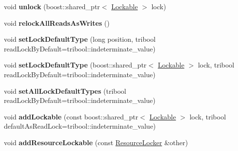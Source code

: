 \begin{DoxyCompactItemize}
\item 
\hypertarget{classcore_1_1threading_1_1_resource_locker_a9464386fc7233fbe830e49c4c0647afe}{void {\bfseries unlock} (boost\-::shared\-\_\-ptr$<$ \hyperlink{classcore_1_1threading_1_1_lockable}{Lockable} $>$ lock)}\label{classcore_1_1threading_1_1_resource_locker_a9464386fc7233fbe830e49c4c0647afe}

\item 
\hypertarget{classcore_1_1threading_1_1_resource_locker_ab740d66b331ea3f19bdf6187a281ae8c}{void {\bfseries relock\-All\-Reads\-As\-Writes} ()}\label{classcore_1_1threading_1_1_resource_locker_ab740d66b331ea3f19bdf6187a281ae8c}

\item 
\hypertarget{classcore_1_1threading_1_1_resource_locker_a36cd91f3f36167989267598df4e2ded8}{void {\bfseries set\-Lock\-Default\-Type} (long position, tribool read\-Lock\-By\-Default=tribool\-::indeterminate\-\_\-value)}\label{classcore_1_1threading_1_1_resource_locker_a36cd91f3f36167989267598df4e2ded8}

\item 
\hypertarget{classcore_1_1threading_1_1_resource_locker_acbbef3762d503d361d9693e6c74c302a}{void {\bfseries set\-Lock\-Default\-Type} (boost\-::shared\-\_\-ptr$<$ \hyperlink{classcore_1_1threading_1_1_lockable}{Lockable} $>$ lock, tribool read\-Lock\-By\-Default=tribool\-::indeterminate\-\_\-value)}\label{classcore_1_1threading_1_1_resource_locker_acbbef3762d503d361d9693e6c74c302a}

\item 
\hypertarget{classcore_1_1threading_1_1_resource_locker_ac2f676b46042839d02da3258d07daa0c}{void {\bfseries set\-All\-Lock\-Default\-Types} (tribool read\-Lock\-By\-Default=tribool\-::indeterminate\-\_\-value)}\label{classcore_1_1threading_1_1_resource_locker_ac2f676b46042839d02da3258d07daa0c}

\item 
\hypertarget{classcore_1_1threading_1_1_resource_locker_aefa94ca874239c39797c16413b0f280f}{void {\bfseries add\-Lockable} (const boost\-::shared\-\_\-ptr$<$ \hyperlink{classcore_1_1threading_1_1_lockable}{Lockable} $>$ lock, tribool default\-As\-Read\-Lock=tribool\-::indeterminate\-\_\-value)}\label{classcore_1_1threading_1_1_resource_locker_aefa94ca874239c39797c16413b0f280f}

\item 
\hypertarget{classcore_1_1threading_1_1_resource_locker_a66362025f4f0dacdd00c078a8d3bea18}{void {\bfseries add\-Resource\-Lockable} (const \hyperlink{classcore_1_1threading_1_1_resource_locker}{Resource\-Locker} \&other)}\label{classcore_1_1threading_1_1_resource_locker_a66362025f4f0dacdd00c078a8d3bea18}


\end{DoxyCompactItemize}
